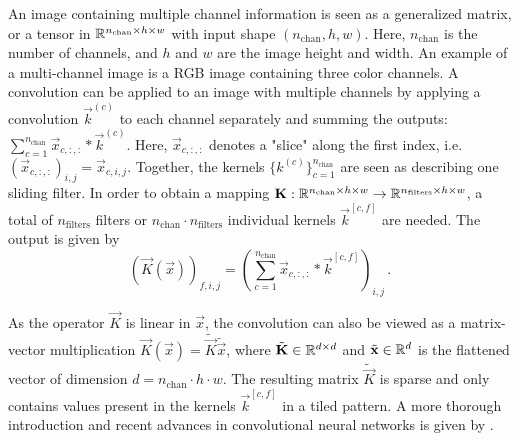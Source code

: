 An image containing multiple channel information 
is seen as a generalized matrix, or a tensor in $\mathbb{R}^{n_\text{chan}\times h \times w}$
with input shape $(n_\text{chan}, h , w)$.
Here, $n_\text{chan}$ is the number of channels, and $h$ and $w$ are the image height and width.
An example of a multi-channel image is a RGB image containing three color channels.
A convolution can be applied to an image with multiple channels by applying a convolution
$\vec k ^{(c)}$ to each channel separately and summing the outputs:
$\sum_{c=1}^{n_\text{chan}} \vec x_{c,:,:} * \vec k ^{(c)}$.
Here, $\vec x_{c,:,:}$ denotes a "slice" along the first index, i.e. $(\vec x_{c,:,:})_{i,j} = \vec x_{c,i,j}$.
Together, the kernels $\{k^{(c)}\}_{c=1}^{n_\text{chan}}$ are seen as describing one sliding filter.
In order to obtain a mapping
$\mathbf K:\mathbb{R}^{n_\text{chan}\times h \times w} \to \mathbb{R}^{n_\text{filters}\times h \times w}$,
a total of $n_\text{filters}$ filters or $n_\text{chan} \cdot n_\text{filters}$ 
individual kernels $\vec k^{[c,f]}$ are needed.
The output is given by
\begin{equation}
\label{eqn:convolution_operator}   
    (\vec K (\vec x))_{f,i,j}
    = \left (\sum_{c=1}^{n_\text{chan}} \vec x_{c,:,:} * \vec k^{[c,f]} \right )_{i,j} \,.
\end{equation}

As the operator $\vec K$ is linear in $\vec x$, the convolution can also be viewed as a matrix-vector multiplication
$\vec K(\vec x) = \tilde {\vec K} \tilde {\vec x}$, where $\tilde {\mathbf K} \in \mathbb{R}^{d\times d}$ and 
$\tilde {\mathbf x} \in \mathbb{R}^d$ is the flattened vector of dimension $d=n_\text{chan}\cdot h \cdot w$.
The resulting matrix $\tilde {\vec K}$ is sparse and only contains values present in the kernels $\vec k^{[c,f]}$
in a tiled pattern.
A more thorough introduction and recent advances in convolutional neural networks is given by \cite{Convnet_advances}.